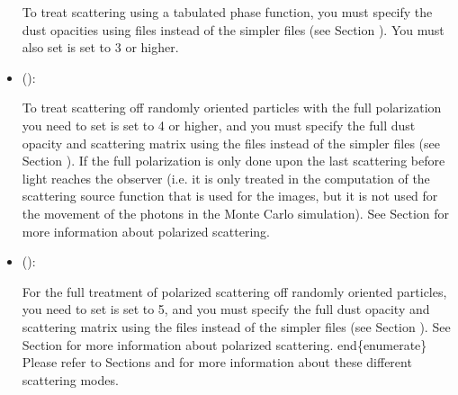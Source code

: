 \documentclass[letterpaper,10pt,english]{sphinxmanual}
\begin{document}
\begin{itemize}
To treat scattering using a tabulated phase function, you must specify the
dust opacities using  files instead of the simpler
 files (see Section {\hyperref[\detokenize{inputoutputfiles:sec-dustkapscatmat-files}]{}}). You
must also set  is set to 3 or higher.

\item {} 
 ():

To treat scattering off randomly oriented particles with the full polarization
you need to set  is set to 4 or higher, and you must
specify the full dust opacity and scattering matrix using the
 files instead of the simpler 
files (see Section {\hyperref[\detokenize{inputoutputfiles:sec-dustkapscatmat-files}]{}}). If 
the full polarization is only done upon the last scattering before light
reaches the observer (i.e. it is only treated in the computation of the
scattering source function that is used for the images, but it is not used for
the movement of the photons in the Monte Carlo simulation).  See Section
{\hyperref[\detokenize{dustradtrans:sec-polarized-scattering}]{}} for more information about polarized
scattering.

\item {} 
 ():

For the full treatment of polarized scattering off randomly oriented
particles, you need to set  is set to 5, and you must
specify the full dust opacity and scattering matrix using the
 files instead of the simpler 
files (see Section {\hyperref[\detokenize{inputoutputfiles:sec-dustkapscatmat-files}]{}}).  See Section
{\hyperref[\detokenize{dustradtrans:sec-polarized-scattering}]{}} for more information about polarized
scattering.  end\{enumerate\} Please refer to Sections
{\hyperref[\detokenize{dustradtrans:sec-scat-phasefunc}]{}} and {\hyperref[\detokenize{dustradtrans:sec-polarized-scattering}]{}} for more
information about these different scattering modes.


\end{itemize}
\end{document}

